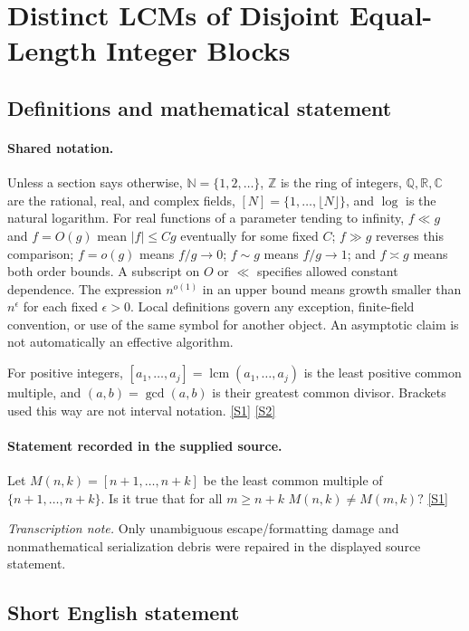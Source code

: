 \documentclass[11pt,a4paper]{article}
\newcommand{\N}{\mathbb{N}}
\newcommand{\Z}{\mathbb{Z}}
\newcommand{\Q}{\mathbb{Q}}
\newcommand{\R}{\mathbb{R}}
\newcommand{\C}{\mathbb{C}}
\newcommand{\sref}[2]{\hyperlink{source:#1:#2}{[S#2]}}
\begin{document}
\section{Distinct LCMs of Disjoint Equal-Length Integer Blocks}\label{statement}


\subsection{Definitions and mathematical statement}

\paragraph{Shared notation.}Unless a section says otherwise, $\N=\{1,2,\ldots\}$,
$\Z$ is the ring of integers, $\Q,\R,\C$ are the rational, real, and complex
fields, $[N]=\{1,\ldots,\lfloor N\rfloor\}$, and $\log$ is the natural
logarithm. For real functions of a parameter tending to infinity,
$f\ll g$ and $f=O(g)$ mean $|f|\leq Cg$ eventually for some fixed $C$;
$f\gg g$ reverses this comparison; $f=o(g)$ means $f/g\to0$;
$f\sim g$ means $f/g\to1$; and $f\asymp g$ means both order bounds.
A subscript on $O$ or $\ll$ specifies allowed constant dependence.
The expression $n^{o(1)}$ in an upper bound means growth smaller than
$n^\epsilon$ for each fixed $\epsilon>0$. Local definitions govern any
exception, finite-field convention, or use of the same symbol for another
object. An asymptotic claim is not automatically an effective algorithm.



For positive integers, $[a_1,\ldots,a_j]=\operatorname{lcm}(a_1,\ldots,a_j)$ is the least positive common multiple, and $(a,b)=\gcd(a,b)$ is their greatest common divisor. Brackets used this way are not interval notation. \sref{statement}{1} \sref{statement}{2}

\paragraph{Statement recorded in the supplied source.}
Let $M(n,k)=[n+1,\ldots,n+k]$ be the least common multiple of $\{n+1,\ldots,n+k\}$.
Is it true that for all $m\geq n+k$ $ M(n,k) \neq M(m,k)? $ \sref{statement}{1}

{\small\emph{Transcription note.} Only unambiguous escape/formatting damage and nonmathematical serialization debris were repaired in the displayed source statement.}

\subsection{Short English statement}
\end{document}
